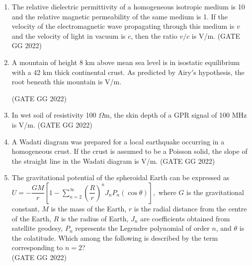 \documentclass[journal]{IEEEtran}
\begin{document}
\begin{enumerate}
\item The relative dielectric permittivity of a homogeneous isotropic medium is 10 and the relative magnetic permeability of the same medium is 1. If the velocity of the electromagnetic wave propagating through this medium is $v$ and the velocity of light in vacuum is $c$, then the ratio $v/c$ is \makebox[2cm]{\hrulefill} V/m. 
\hfill(GATE GG 2022)
\vspace{0.5cm}

\item A mountain of height 8 km above mean sea level is in isostatic equilibrium with a 42 km thick continental crust. As predicted by Airy$'$s hypothesis, the root beneath this mountain is \makebox[2cm]{\hrulefill} V/m.   

\hfill(GATE GG 2022)
\vspace{0.5cm}

\item In wet soil of resistivity 100 $\Omega$m, the skin depth of a GPR signal of 100 MHz is \makebox[2cm]{\hrulefill} V/m.   
\hfill(GATE GG 2022)
\vspace{0.5cm}


\item A Wadati diagram was prepared for a local earthquake occurring in a homogeneous crust. If the crust is assumed to be a Poisson solid, the slope of the straight line in the Wadati diagram is \makebox[2cm]{\hrulefill} V/m. 
\hfill(GATE GG 2022)
\vspace{0.5cm}

\item The gravitational potential of the spheroidal Earth can be expressed as    \textbf{$U = -\dfrac{G M}{r}\left[1 - \sum_{n=2}^{\infty} \left(\dfrac{R}{r}\right)^n J_n P_n(\cos \theta)\right],$}
where $G$ is the gravitational constant, $M$ is the mass of the Earth, $r$ is the radial distance from the centre of the Earth, $R$ is the radius of Earth, $J_n$ are coefficients obtained from satellite geodesy, $P_n$ represents the Legendre polynomial of order $n$, and $\theta$ is the colatitude.  
Which among the following is described by the term corresponding to $n=2$?\\  
\hfill(GATE GG 2022)


\end{enumerate}
\end{document}
